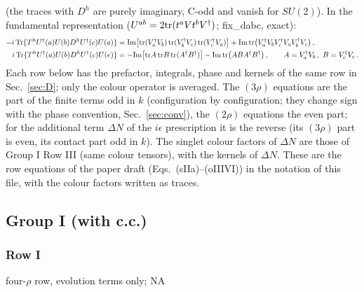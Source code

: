 (the traces with $D^{h}$ are purely imaginary, C-odd and vanish for $SU(2)$). In the fundamental representation ($U^{ab}=2{\rm tr}(t^{a}Vt^{b}V^{\dagger})$; fix\_dabc, exact):
\begin{align}
-i\,{\rm Tr}\{T^{h}U^{\dagger}(a)U(b)D^{h}U^{\dagger}(c)U(a)\}&={\rm Im}\big[{\rm tr}(V^{\dagger}_{a}V_{b})\,{\rm tr}(V^{\dagger}_{b}V_{c})\,{\rm tr}(V^{\dagger}_{c}V_{a})\big]+{\rm Im}\,{\rm tr}\big(V^{\dagger}_{a}V_{b}V^{\dagger}_{c}V_{a}V^{\dagger}_{b}V_{c}\big)\,,\notag\\
i\,{\rm Tr}\{T^{h}U^{\dagger}(a)U(b)D^{h}U^{\dagger}(c)U(e)\}&=-{\rm Im}\big[{\rm tr}A\,{\rm tr}B\,{\rm tr}(A^{\dagger}B^{\dagger})\big]-{\rm Im}\,{\rm tr}\big(ABA^{\dagger}B^{\dagger}\big)\,,\qquad A=V^{\dagger}_{a}V_{b}\,,\ B=V^{\dagger}_{c}V_{e}\,.\notag
\end{align}
Each row below has the prefactor, integrals, phase and kernels of the same row in Sec.~\ref{sec:D}; only the colour operator is averaged. The $(3\rho)$ equations are the part of the finite terms odd in $k$ (configuration by configuration; they change sign with the phase convention, Sec.~\ref{sec:conv}), the $(2\rho)$ equations the even part; for the additional term $\Delta N$ of the $i\epsilon$ prescription it is the reverse (its $(3\rho)$ part is even, its contact part odd in $k$). The singlet colour factors of $\Delta N$ are those of Group I Row III (same colour tensors), with the kernels of $\Delta N$. These are the row equations of the paper draft (Eqs.~(sIIa)--(oIIIVI)) in the notation of this file, with the colour factors written as traces.
\subsection{Group I (with c.c.)}
\subsubsection*{Row I}
four-$\rho$ row, evolution terms only; \textsc{NA}
